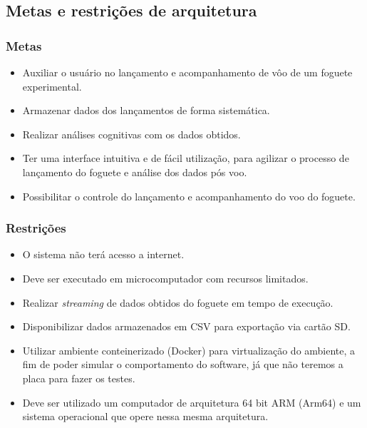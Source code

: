 \subsection{Metas e restrições de arquitetura}

\subsubsection{Metas}
\begin{itemize}
    \item Auxiliar o usuário no lançamento e acompanhamento de vôo de um foguete experimental.
    \item Armazenar dados dos lançamentos de forma sistemática.
    \item Realizar análises cognitivas com os dados obtidos.
    \item Ter uma interface intuitiva e de fácil utilização, para agilizar o processo de lançamento do foguete e análise dos dados pós voo.
    \item Possibilitar o controle do lançamento e acompanhamento do voo do foguete.
\end{itemize}

\subsubsection{Restrições}
\begin{itemize}
    \item O sistema não terá acesso a internet.
    \item Deve ser executado em microcomputador com recursos limitados.
    \item Realizar  \textit{streaming} de dados obtidos do foguete em tempo de execução.
    \item Disponibilizar dados armazenados em CSV para exportação via cartão SD.
    \item Utilizar ambiente conteinerizado (Docker) para virtualização do ambiente, a fim de poder simular o comportamento do software, já que não teremos a placa para fazer os testes.
    \item Deve ser utilizado um computador de arquitetura 64 bit ARM (Arm64) e um sistema operacional que opere nessa mesma arquitetura.
\end{itemize}









